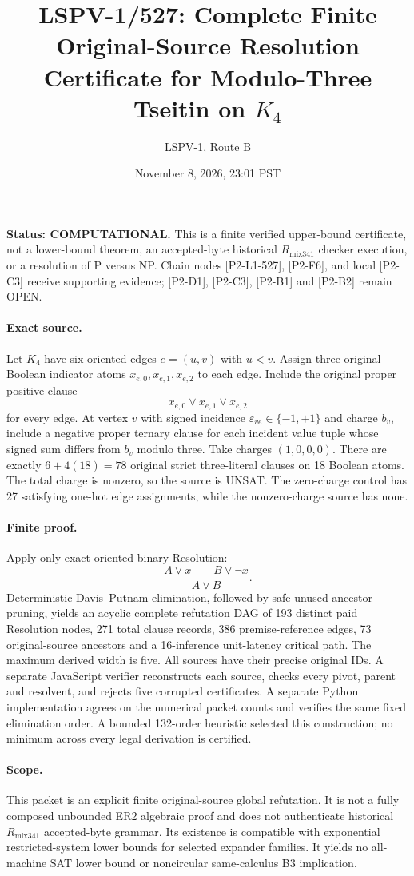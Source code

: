 \documentclass[11pt]{article}
\title{LSPV-1/527: Complete Finite Original-Source Resolution Certificate for Modulo-Three Tseitin on $K_4$}
\author{LSPV-1, Route B}
\date{November 8, 2026, 23:01 PST}
\begin{document}
\maketitle
\noindent\textbf{Status: COMPUTATIONAL.} This is a finite verified upper-bound certificate, not a lower-bound theorem, an accepted-byte historical $R_{\mathrm{mix341}}$ checker execution, or a resolution of P versus NP. Chain nodes [P2-L1-527], [P2-F6], and local [P2-C3] receive supporting evidence; [P2-D1], [P2-C3], [P2-B1] and [P2-B2] remain OPEN.

\paragraph{Exact source.}
Let $K_4$ have six oriented edges $e=(u,v)$ with $u<v$. Assign three original Boolean indicator atoms $x_{e,0},x_{e,1},x_{e,2}$ to each edge. Include the original proper positive clause
\[
 x_{e,0}\vee x_{e,1}\vee x_{e,2}
\]
for every edge. At vertex $v$ with signed incidence $\varepsilon_{ve}\in\{-1,+1\}$ and charge $b_v$, include a negative proper ternary clause for each incident value tuple whose signed sum differs from $b_v$ modulo three. Take charges $(1,0,0,0)$. There are exactly $6+4(18)=78$ original strict three-literal clauses on 18 Boolean atoms. The total charge is nonzero, so the source is UNSAT. The zero-charge control has 27 satisfying one-hot edge assignments, while the nonzero-charge source has none.

\paragraph{Finite proof.}
Apply only exact oriented binary Resolution:
\[
\frac{A\vee x\qquad B\vee\neg x}{A\vee B}.
\]
Deterministic Davis--Putnam elimination, followed by safe unused-ancestor pruning, yields an acyclic complete refutation DAG of 193 distinct paid Resolution nodes, 271 total clause records, 386 premise-reference edges, 73 original-source ancestors and a 16-inference unit-latency critical path. The maximum derived width is five. All sources have their precise original IDs. A separate JavaScript verifier reconstructs each source, checks every pivot, parent and resolvent, and rejects five corrupted certificates. A separate Python implementation agrees on the numerical packet counts and verifies the same fixed elimination order. A bounded 132-order heuristic selected this construction; no minimum across every legal derivation is certified.

\paragraph{Scope.}
This packet is an explicit finite original-source global refutation. It is not a fully composed unbounded ER2 algebraic proof and does not authenticate historical $R_{\mathrm{mix341}}$ accepted-byte grammar. Its existence is compatible with exponential restricted-system lower bounds for selected expander families. It yields no all-machine SAT lower bound or noncircular same-calculus B3 implication.
\end{document}
